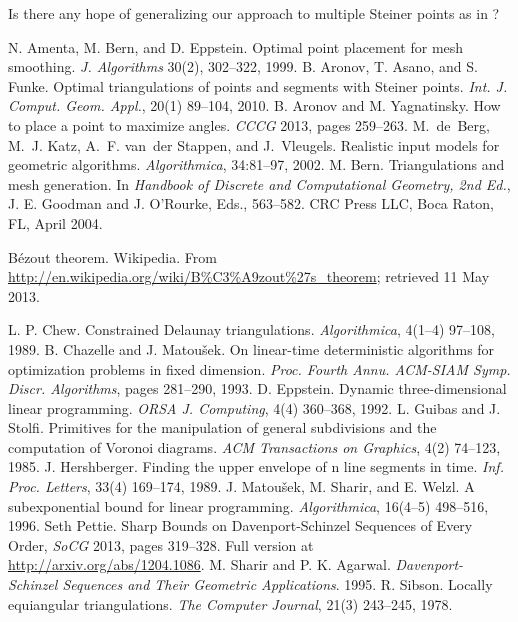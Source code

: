 \documentclass{cccg13}
\begin{document}
Is there any hope of generalizing our approach to multiple Steiner points as in \cite{orig}?

\begin{thebibliography}{}
 N. Amenta, M. Bern, and D. Eppstein.
	Optimal point placement for mesh smoothing.
	\emph{J. Algorithms} 30(2), 302--322, 1999.
 B. Aronov, T. Asano, and S. Funke.	
	Optimal triangulations of points and segments with Steiner points.
	\emph{Int. J. Comput. Geom. Appl.},
	20(1) 89--104, 2010.
	B. Aronov and M. Yagnatinsky.
	How to place a point to maximize angles.
	\emph{CCCG} 2013, pages 259--263.
	M.~de~Berg, M.~J. Katz, A.~F. van~der Stappen, and J.~Vleugels.
	Realistic input models for geometric algorithms.
	\emph{Algorithmica}, 34:81--97, 2002.
 M. Bern.  Triangulations and mesh generation.
	In \emph{Handbook of Discrete and Computational Geometry, 2nd Ed.},
	J. E. Goodman and J. O'Rourke, Eds., 563--582.
	CRC Press LLC, Boca Raton, FL, April 2004.

{\raggedright {}
	B\'ezout theorem.  Wikipedia.  From
	\url{http://en.wikipedia.org/wiki/B\%C3\%A9zout\%27s\_theorem}; retrieved 11 May 2013.

} L. P. Chew. Constrained Delaunay triangulations.
	\emph{Algorithmica}, 4(1--4) 97--108, 1989.
 B. Chazelle and J. Matou\v{s}ek.
	On linear-time deterministic algorithms for optimization problems in fixed dimension.
	\emph{Proc. Fourth Annu. ACM-SIAM Symp. Discr. Algorithms}, pages 281--290, 1993.
 D. Eppstein.  Dynamic three-dimensional linear programming.
        \emph{ORSA J. Computing},
        4(4) 360--368, 1992.
 L. Guibas and J. Stolfi.
  Primitives for the manipulation of general subdivisions and the computation of Voronoi diagrams.
  \emph{ACM Transactions on Graphics}, 4(2) 74--123, 1985.
 J. Hershberger.
	Finding the upper envelope of n line segments in  time.
	\emph{Inf. Proc. Letters}, 33(4) 169--174, 1989.
 J. Matou\v sek, M. Sharir, and E. Welzl.
  A subexponential bound for linear programming.
  \emph{Algorithmica}, 16(4--5) 498--516, 1996.
  Seth Pettie. Sharp Bounds on Davenport-Schinzel Sequences of Every Order,
	\emph{SoCG} 2013, pages 319--328.  Full version at \url{http://arxiv.org/abs/1204.1086}.
 M. Sharir and P. K. Agarwal.
	\emph{Davenport-Schinzel Sequences and Their Geometric Applications}. 1995.
 R. Sibson.  Locally equiangular triangulations.
	\emph{The Computer Journal}, 21(3) 243--245, 1978.
\end{thebibliography}
\ifcccg\balance\fi
\end{document}
